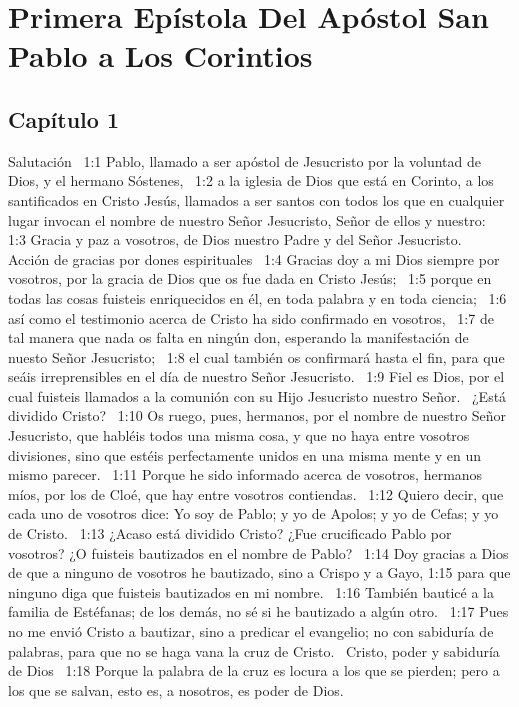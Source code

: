 \chapter{Primera Epístola Del Apóstol San Pablo a Los Corintios}

\section*{Capítulo 1}
Salutación  
1:1 Pablo, llamado a ser apóstol de Jesucristo por la voluntad de Dios, y el hermano Sóstenes,  
1:2 a la iglesia de Dios que está en Corinto, a los santificados en Cristo Jesús, llamados a ser santos con todos los que en cualquier lugar invocan el nombre de nuestro Señor Jesucristo, Señor de ellos y nuestro:  
1:3 Gracia y paz a vosotros, de Dios nuestro Padre y del Señor Jesucristo.  
Acción de gracias por dones espirituales  
1:4 Gracias doy a mi Dios siempre por vosotros, por la gracia de Dios que os fue dada en Cristo Jesús;  
1:5 porque en todas las cosas fuisteis enriquecidos en él, en toda palabra y en toda ciencia;  
1:6 así como el testimonio acerca de Cristo ha sido confirmado en vosotros,  
1:7 de tal manera que nada os falta en ningún don, esperando la manifestación de nuesto Señor Jesucristo;  
1:8 el cual también os confirmará hasta el fin, para que seáis irreprensibles en el día de nuestro Señor Jesucristo.  
1:9 Fiel es Dios, por el cual fuisteis llamados a la comunión con su Hijo Jesucristo nuestro Señor.  
¿Está dividido Cristo?  
1:10 Os ruego, pues, hermanos, por el nombre de nuestro Señor Jesucristo, que habléis todos una misma cosa, y que no haya entre vosotros divisiones, sino que estéis perfectamente unidos en una misma mente y en un mismo parecer.  
1:11 Porque he sido informado acerca de vosotros, hermanos míos, por los de Cloé, que hay entre vosotros contiendas.  
1:12 Quiero decir, que cada uno de vosotros dice: Yo soy de Pablo; y yo de Apolos; y yo de Cefas; y yo de Cristo.  
1:13 ¿Acaso está dividido Cristo? ¿Fue crucificado Pablo por vosotros? ¿O fuisteis bautizados en el nombre de Pablo?  
1:14 Doy gracias a Dios de que a ninguno de vosotros he bautizado, sino a Crispo y a Gayo, 
1:15 para que ninguno diga que fuisteis bautizados en mi nombre.  
1:16 También bauticé a la familia de Estéfanas; de los demás, no sé si he bautizado a algún otro.  
1:17 Pues no me envió Cristo a bautizar, sino a predicar el evangelio; no con sabiduría de palabras, para que no se haga vana la cruz de Cristo.  
Cristo, poder y sabiduría de Dios  
1:18 Porque la palabra de la cruz es locura a los que se pierden; pero a los que se salvan, esto es, a nosotros, es poder de Dios.  
